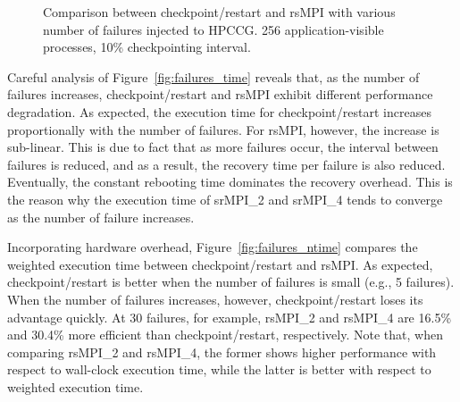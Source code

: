 \begin{figure}[!t]
  \begin{center}
  \end{center}
  \caption{Comparison between checkpoint/restart and rsMPI with various number of failures injected to HPCCG. 256 application-visible processes, 10\% checkpointing interval.}
  \label{fig:multiple_failure}
\end{figure}


Careful analysis of Figure~\ref{fig:failures_time} reveals that, as the number of failures increases, checkpoint/restart and rsMPI exhibit different performance degradation. As expected, the execution time for checkpoint/restart increases proportionally with the number of failures. For rsMPI, however, the increase is sub-linear. This is due to fact that as more failures occur, the interval between failures is reduced, and as a result, the recovery time per failure is also reduced. 
Eventually, the constant rebooting time dominates the recovery overhead. This is the reason why the execution time of srMPI\_2 and srMPI\_4 tends to converge as the number of failure increases. 

Incorporating hardware overhead, Figure~\ref{fig:failures_ntime} compares the weighted execution time between checkpoint/restart and rsMPI.  As expected, checkpoint/restart is better when the number of  failures is small (e.g., 5 failures).  When the number of failures increases,  however, checkpoint/restart loses its advantage quickly. At 30 failures, for example, rsMPI\_2 and rsMPI\_4 are 16.5\% and 30.4\% more efficient than checkpoint/restart, respectively.
Note that, when comparing rsMPI\_2 and rsMPI\_4, the former shows higher performance with respect to wall-clock execution time, while the latter is better with respect to weighted execution time. 


